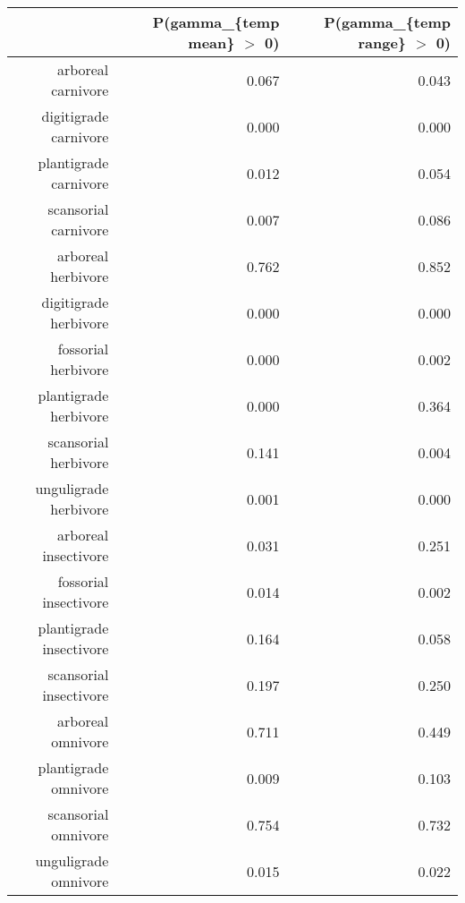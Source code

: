 \begin{table}[ht]
\centering
\begin{tabular}{rrr}
  \hline
 & P(gamma\_\{temp mean\} $>$ 0) & P(gamma\_\{temp range\} $>$ 0) \\ 
  \hline
arboreal carnivore & 0.067 & 0.043 \\ 
  digitigrade carnivore & 0.000 & 0.000 \\ 
  plantigrade carnivore & 0.012 & 0.054 \\ 
  scansorial carnivore & 0.007 & 0.086 \\ 
  arboreal herbivore & 0.762 & 0.852 \\ 
  digitigrade herbivore & 0.000 & 0.000 \\ 
  fossorial herbivore & 0.000 & 0.002 \\ 
  plantigrade herbivore & 0.000 & 0.364 \\ 
  scansorial herbivore & 0.141 & 0.004 \\ 
  unguligrade herbivore & 0.001 & 0.000 \\ 
  arboreal insectivore & 0.031 & 0.251 \\ 
  fossorial insectivore & 0.014 & 0.002 \\ 
  plantigrade insectivore & 0.164 & 0.058 \\ 
  scansorial insectivore & 0.197 & 0.250 \\ 
  arboreal omnivore & 0.711 & 0.449 \\ 
  plantigrade omnivore & 0.009 & 0.103 \\ 
  scansorial omnivore & 0.754 & 0.732 \\ 
  unguligrade omnivore & 0.015 & 0.022 \\ 
   \hline
\end{tabular}
\label{tab:origin_temp}
\end{table}
